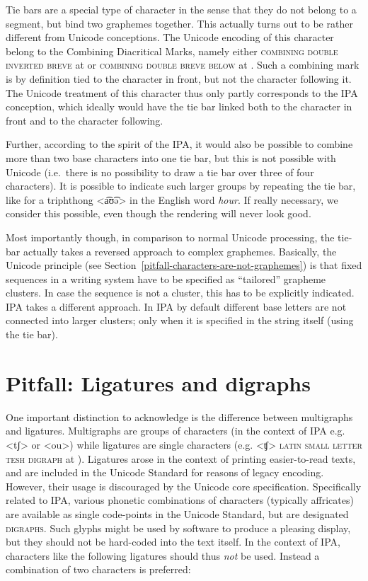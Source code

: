 Tie bars are a special type of character in the sense that they do not belong to
a segment, but bind two graphemes together. This actually turns out to be rather
different from Unicode conceptions. The Unicode encoding of this character
belong to the Combining Diacritical Marks, namely either \textsc{combining double
inverted breve} at  or \textsc{combining double breve below} at
. Such a combining mark is by definition tied to the character in
front, but not the character following it. The Unicode treatment of this
character thus only partly corresponds to the IPA conception, which ideally
would have the tie bar linked both to the character in front and to the
character following. 

Further, according to the spirit of the IPA, it would also be possible to
combine more than two base characters into one tie bar, but this is not possible
with Unicode (i.e.~there is no possibility to draw a tie bar over three of four
characters). It is possible to indicate such larger groups by repeating the tie
bar, like for a triphthong <a͡ʊ͡ə> in the English word \textit{hour}. If really
necessary, we consider this possible, even though the rendering will never look
good. 

Most importantly though, in comparison to normal Unicode processing, the tie-bar
actually takes a reversed approach to complex graphemes. Basically, the Unicode
principle (see Section~\ref{pitfall-characters-are-not-graphemes}) is that fixed
sequences in a writing system have to be specified as ``tailored'' grapheme
clusters. In case the sequence is not a cluster, this has to be explicitly
indicated. IPA takes a different approach. In IPA by default different base
letters are not connected into larger clusters; only when it is specified in the
string itself (using the tie bar).

\section{Pitfall: Ligatures and digraphs}
\label{pitfall-ligatures-digraphs}     


One important distinction to acknowledge is the difference between multigraphs
and ligatures. Multigraphs are groups of characters (in the context of IPA e.g.
<tʃ> or <ou>) while ligatures are single characters (e.g. <ʧ> \textsc{latin
small letter tesh digraph} at ). Ligatures arose in the context of
printing easier-to-read texts, and are included in the Unicode Standard for
reasons of legacy encoding. However, their usage is discouraged by the Unicode
core specification. Specifically related to IPA, various phonetic combinations
of characters (typically affricates) are available as single code-points in the
Unicode Standard, but are designated \textsc{digraphs}. Such glyphs might be used by
software to produce a pleasing display, but they should not be hard-coded into
the text itself. In the context of IPA, characters like the following ligatures
should thus \emph{not} be used. Instead a combination of two characters is
preferred:
      
